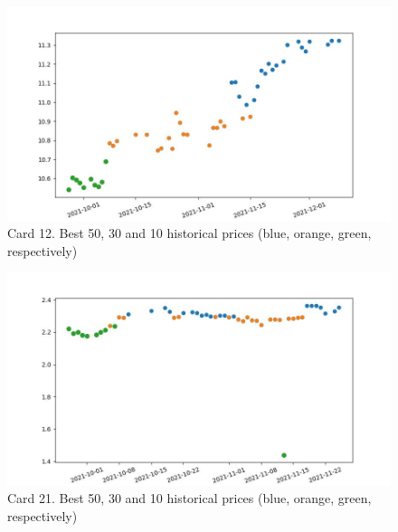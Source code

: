 \begin{figure}
    \centering
    \includegraphics[width=\textwidth]{figures/card_12.jpg}
    \caption{Card 12. Best 50, 30 and 10 historical prices (blue, orange, green, respectively)}
    \label{fig:card_12}
\end{figure}

\begin{figure}
    \centering
    \includegraphics[width=\textwidth]{figures/card_21.jpg}
    \caption{Card 21. Best 50, 30 and 10 historical prices (blue, orange, green, respectively)}
    \label{fig:card_21}
\end{figure}

